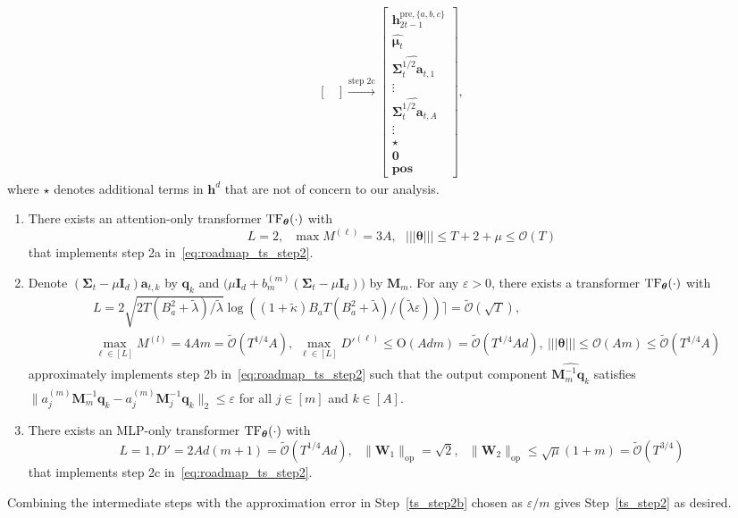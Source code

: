 \documentclass[10pt]{article}
\newcommand{\id}{\bI}
\newcommand{\eps}{\varepsilon}
\newcommand{\lops}[1]{\|{#1}\|_{\mathrm{op}}}
\renewcommand{\cO}{\mathcal{O}}
\newcommand{\<}{\left\langle}
\renewcommand{\>}{\right\rangle}
\newcommand{\lth}{{(\ell)}}
\newcommand{\TF}{{\rm TF}}
\newcommand{\bzero}{{\mathbf 0}}
\newcommand{\nrmp}[1]{{\left|\!\left|\!\left|{#1}\right|\!\right|\!\right|}}
\newcommand{\pre}{{\mathrm{pre}}}
\newcommand{\posv}{{\mathbf{pos}}}
\newcommand{\parta}{{a}}
\newcommand{\partb}{{b}}
\newcommand{\partc}{{c}}
\newcommand{\partd}{{d}}
\newcommand{\Tpsmean}{{{\mathbf\mu}}}
\newcommand{\Tpscov}{{{\mathbf\Sigma}}}
\newcommand{\prodeig}{{\mu}}
\newcommand{\padecond}{{\tilde \kappa}}
\newcommand{\intvec}{{\mathbf {q}}}
\newcommand{\intmat}{{\mathbf {M}}}
\newcommand{\tcO}{{\tilde{\mathcal O}}}
\newcommand{\hidden}{{D'}}
\newcommand{\conO}{{\mathrm{O}}}
\def\bI{{\mathbf I}}
\def\bW{{\mathbf W}}
\def\btheta{{\boldsymbol \theta}}
\def\ba{{\mathbf a}}
\def\bh{{\mathbf h}}
\begin{document}
\begin{align}
\begin{bmatrix}
\end{bmatrix}
\xrightarrow{\text{step 2c}}
   \begin{bmatrix}
    \bh_{2t-1}^{\pre,\{\parta,\partb,\partc\}}\\\widehat{\Tpsmean_t}
        \\
\widehat{\Tpscov_t^{1/2}\ba_{t,1}}
\\\vdots\\
         \widehat{\Tpscov_t^{1/2}\ba_{t,A}}\\\vdots\\
        \star\\ \bzero \\\posv
\end{bmatrix}\label{eq:roadmap_ts_step2},
\end{align}
where $\star$ denotes additional terms in $\bh^\partd$ that are not of concern to our analysis.

\begin{enumerate}[label=Step 2\alph*,ref= 2\alph*]
        \item\label{ts_step2a}  There exists an attention-only transformer $\TF_\btheta(\cdot)$ with     $$L=2,~~~\max M^{\lth}=3A,~~~ \nrmp{\btheta}\leq T+2+{\prodeig}\leq\cO(T) $$
 that implements step 2a in~\eqref{eq:roadmap_ts_step2}.
     \item\label{ts_step2b} Denote ${(\Tpscov_t-\prodeig\id_d)\ba_{t,k}}$ by  $\intvec_{k}$ and $\Big({\prodeig}\id_d+{b_m^{(m)}(\Tpscov_t-\prodeig \id_d)}\Big)$ by $\intmat_m$. For any $\eps>0$,   there exists a  transformer $\TF_\btheta(\cdot)$ with
     \begin{align*}
     &L=2\sqrt{2 T(B_a^2+\tilde\lambda)/\tilde\lambda}\log((1+\padecond)B_aT(B_a^2+\tilde\lambda)/(\tilde\lambda\eps))\rceil=\tcO(\sqrt{T}),\\  &
     \max_{\ell\in[L]}M^{(l)}=4Am=\tcO(T^{1/4}A),~\max_{\ell\in[L]}\hidden^\lth\leq \conO(Adm)=\tcO(T^{1/4}Ad),~ \nrmp{\btheta}\leq  \cO(Am)\leq  \tcO(T^{1/4}A)
     \end{align*}
     approximately implements step 2b in~\eqref{eq:roadmap_ts_step2} such that the output component $\widehat{\intmat_m^{-1}\intvec_k}$ satisfies $\|\widehat{a_j^{(m)}\intmat_m^{-1}\intvec_k}-{a_j^{(m)}\intmat_j^{-1}\intvec_k}\|_2\leq\eps$ for all $j\in[m]$ and $k\in[A]$.
 \item\label{ts_step2c}  There exists an MLP-only transformer $\TF_\btheta(\cdot)$ with     $$L=1,D'=2Ad(m+1)=\tcO(T^{1/4}Ad),~~~\lops{\bW_1}=\sqrt{2}, ~~~\lops{\bW_2}\leq \sqrt{\prodeig}(1+m)=\tcO(T^{3/4})$$  that implements step 2c in~\eqref{eq:roadmap_ts_step2}.
\end{enumerate}
Combining the intermediate steps with the approximation error in Step~\ref{ts_step2b} chosen as $\eps/m$  gives Step~\ref{ts_step2} as desired.
\end{document}
